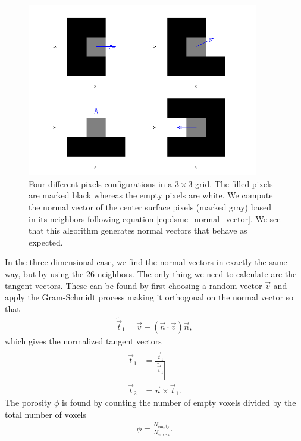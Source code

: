 \begin{figure}[htb]
\begin{center}
\includegraphics[width=0.9\textwidth, trim=0cm 0cm 0cm 0cm, clip]{DSMC/figures/normal_vectors.png}
\end{center}
\caption{Four different pixels configurations in a $3\times 3$ grid. The filled pixels are marked black whereas the empty pixels are white. We compute the normal vector of the center surface pixels (marked gray) based in its neighbors following equation \eqref{eq:dsmc_normal_vector}. We see that this algorithm generates normal vectors that behave as expected.}
\label{fig:dsmc_normal_vectors}
\end{figure}
In the three dimensional case, we find the normal vectors in exactly the same way, but by using the 26 neighbors. The only thing we need to calculate are the tangent vectors. These can be found by first choosing a random vector $\vec v$ and apply the Gram-Schmidt process making it orthogonal on the normal vector so that
\begin{align}
	\tilde{\vec t}_1 = \vec v - (\vec n\cdot \vec v)\vec n,
\end{align}
which gives the normalized tangent vectors
\begin{align}
	\vec t_1 &= \frac{ \tilde{\vec t}_1}{|\tilde{\vec t}_1|}\\
	\vec t_2 &= \vec n\times \vec t_1.
\end{align}
The porosity $\phi$ is found by counting the number of empty voxels divided by the total number of voxels
\begin{align}
	\label{eq:dsmc_geometry_porosity}
	\phi = \frac{N_\text{empty}}{N_\text{voxels}}.
\end{align}